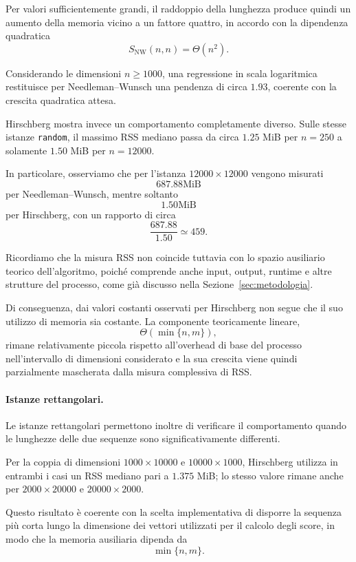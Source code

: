 Per valori sufficientemente grandi, il raddoppio della lunghezza produce quindi un aumento della memoria vicino a un fattore quattro,
in accordo con la dipendenza quadratica
\[
    S_{\text{NW}}(n,n) = \Theta(n^{2}).
\]

Considerando le dimensioni $n \geq 1000$, una regressione in scala logaritmica restituisce per Needleman--Wunsch una pendenza di circa $1.93$,
coerente con la crescita quadratica attesa.

Hirschberg mostra invece un comportamento completamente diverso. Sulle stesse istanze \texttt{random}, il massimo RSS mediano
passa da circa $1.25$ MiB per $n=250$ a solamente $1.50$ MiB per $n=12000$.

In particolare, osserviamo che per l'istanza $12000  \times 12000$ vengono misurati
\[ 
    687.88 \text{MiB}
\]
per Needleman--Wunsch, mentre soltanto
\[
    1.50 \text{MiB}
\]
per Hirschberg, con un rapporto di circa
\[
    \frac{687.88}{1.50}\simeq 459.
\]

Ricordiamo che la misura RSS non coincide tuttavia con lo spazio ausiliario teorico dell'algoritmo, poiché comprende anche
input, output, runtime e altre strutture del processo, come già discusso nella Sezione~\ref{sec:metodologia}.

Di conseguenza, dai valori costanti osservati per Hirschberg non segue che il suo utilizzo di memoria sia costante. La componente
teoricamente lineare,
\[
    \Theta( \min \{ n,m \}),
\]
rimane relativamente piccola rispetto all'overhead di base del processo nell'intervallo di dimensioni considerato e la sua crescita viene
quindi parzialmente mascherata dalla misura complessiva di RSS.

\paragraph{Istanze rettangolari.} Le istanze rettangolari permettono inoltre di verificare il comportamento quando le lunghezze delle due
sequenze sono significativamente differenti.

Per la coppia di dimensioni $1000 \times 10000$ e $10000  \times 1000$, Hirschberg utilizza in entrambi i casi un RSS mediano pari a $1.375$ MiB; lo stesso
valore rimane anche per $2000  \times 20000$ e $20000  \times 2000$.

Questo risultato è coerente con la scelta implementativa di disporre la sequenza più corta lungo la dimensione dei vettori utilizzati
per il calcolo degli score, in modo che la memoria ausiliaria dipenda da
\[
    \min \{ n,m\}.
\]

